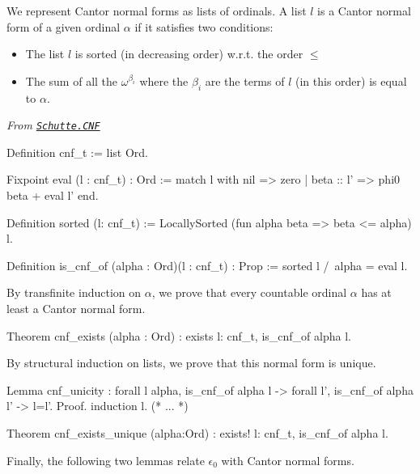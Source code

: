 \documentclass[a4paper]{book}
\begin{document}
{We represent  Cantor normal forms as lists of ordinals.
A  list $l$ is a Cantor normal form of a given ordinal $\alpha$ if it satisfies two conditions:



\begin{itemize}
\item The list  $l$ is sorted (in decreasing order) w.r.t. the order $\leq$
\item The sum of all the  $\omega^{\beta_i}$ where the $\beta_i$ are the terms of $l$ (in this order) is equal to $\alpha$.
\end{itemize}



\vspace{4pt}

\noindent\emph{From \href{../src/html/hydras.Schutte.CNF.html\#cnf_t}%
{\texttt{Schutte.CNF}}}


\begin{Coqsrc}
 Definition cnf_t := list Ord.

Fixpoint eval (l : cnf_t) : Ord :=
  match l with nil => zero
              | beta :: l' => phi0 beta + eval l'
  end.

Definition sorted (l: cnf_t) :=
  LocallySorted (fun alpha beta => beta <= alpha) l.

Definition is_cnf_of (alpha : Ord)(l : cnf_t) : Prop :=
  sorted l /\ alpha = eval l.
\end{Coqsrc}


By transfinite induction on $\alpha$, we prove that every countable ordinal $\alpha$ 
 has at least a Cantor normal form.

\begin{Coqsrc}
Theorem cnf_exists (alpha : Ord) :
  exists l: cnf_t, is_cnf_of alpha l.
\end{Coqsrc}

By structural induction on lists, we prove that this normal form is unique.

\begin{Coqsrc}
 Lemma cnf_unicity : forall l alpha, 
   is_cnf_of alpha l -> 
   forall l',  is_cnf_of alpha l' -> l=l'.
Proof.
 induction l.
 (*  ...  *)

Theorem cnf_exists_unique (alpha:Ord) :
  exists! l: cnf_t, is_cnf_of alpha l.
\end{Coqsrc}


Finally, the following two lemmas relate  $\epsilon_0$ with Cantor normal forms.

}
\end{document}
